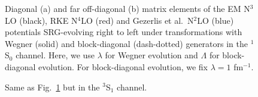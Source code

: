 \documentclass[preprintnumbers,floatfix,aps,prc,preprint,nofootinbib]{revtex4-1}
\begin{document}
\begin{figure}[H]
	\centering
	
	\caption{Diagonal (a) and far off-diagonal (b) matrix elements of the EM N$^3$LO (black), RKE N$^4$LO (red) and Gezerlis et al.~N$^2$LO (blue) potentials SRG-evolving right to left under transformations with Wegner (solid) and block-diagonal (dash-dotted) generators in the $^1$S$_0$ channel. Here, we use $\lambda$ for Wegner evolution and $\Lambda$ for block-diagonal evolution. For block-diagonal evolution, we fix $\lambda=1$ fm$^{-1}$.}
	\label{fig:potential_slices_1S0}
\end{figure}
%
\begin{figure}[H]
	\centering
	
	\caption{Same as Fig.~\ref{fig:potential_slices_1S0} but in the $^3$S$_1$ channel.}
	\label{fig:potential_slices_3S1}
\end{figure}
\end{document}
